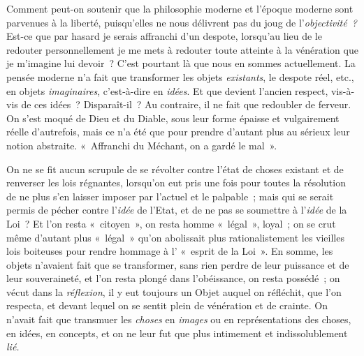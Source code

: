 \documentclass[french,twoside]{book} %
\begin{document}
Comment peut-on soutenir que la philosophie moderne et l’époque moderne sont parvenues à la liberté, puisqu’elles ne nous délivrent pas du joug de l’\emph{objectivité ?} Est-ce que par hasard je serais affranchi d’un despote, lorsqu’au lieu de le redouter personnellement je me mets à redouter toute atteinte à la vénération que je m’imagine lui devoir ? C’est pourtant là que nous en sommes actuellement. La pensée moderne n’a fait que transformer les objets \emph{existants}, le despote réel, etc., en objets \emph{imaginaires}, c’est-à-dire en \emph{idées}. Et que devient l’ancien respect, vis-à-vis de ces idées ? Disparaît-il ? Au contraire, il ne fait que redoubler de ferveur. On s’est moqué de Dieu et du Diable, sous leur forme épaisse et vulgairement réelle d’autrefois, mais ce n’a été que pour prendre d’autant plus au sérieux leur notion abstraite. « Affranchi du Méchant, on a gardé le mal ».\par
On ne se fit aucun scrupule de se révolter contre l’état de choses existant et de renverser les lois régnantes, lorsqu’on eut pris une fois pour toutes la résolution de ne plus s’en laisser imposer par l’actuel et le palpable ; mais qui se serait permis de pécher contre l’\emph{idée} de l’Etat, et de ne pas se soumettre à l’\emph{idée} de la Loi ? Et l’on resta « citoyen », on resta homme « légal », loyal ; on se crut même d’autant plus « légal » qu’on abolissait plus rationalistement les vieilles lois boiteuses pour rendre hommage à l’ « esprit de la Loi ». En somme, les objets n’avaient fait que se transformer, sans rien perdre de leur puissance et de leur souveraineté, et l’on resta plongé dans l’obéissance, on resta possédé ; on vécut dans la \emph{réflexion}, il y eut toujours un Objet auquel on réfléchit, que l’on respecta, et devant lequel on se sentit plein de vénération et de crainte. On n’avait fait que transmuer les \emph{choses} en \emph{images} ou en représentations des  choses, en idées, en concepts, et on ne leur fut que plus intimement et indissolublement \emph{lié.}\par
\end{document}
